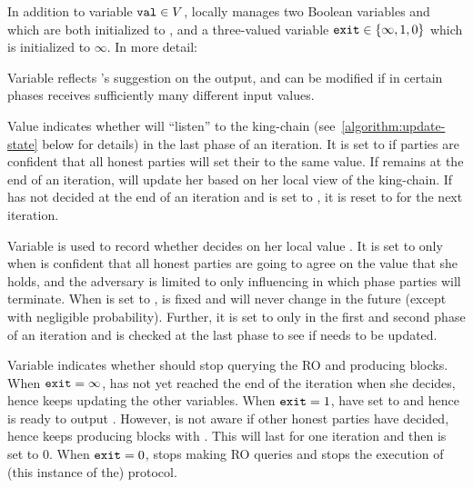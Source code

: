 In addition to variable $\mathtt{val} \in V$, \party locally manages two Boolean variables \lock and \decide which are both initialized to \false, and a three-valued variable $\mathtt{exit} \in \{\infty, 1, 0\}$ which is initialized to $\infty$.
%
In more detail:

\begin{cccItemize}[noitemsep]
    \item Variable \val reflects \party's suggestion on the output, and can be modified if in certain phases \party receives sufficiently many different input values.

    \item Value \lock indicates whether \party will ``listen'' to the king-chain (see~\cref{algorithm:update-state} below for details) in the last phase of an iteration.
    It is set to \true if parties are confident that all honest parties will set their \val to the same value.
    If \lock remains \false at the end of an iteration, \party will update her \val based on her local view of the king-chain.
    If \party has not decided at the end of an iteration and \lock is set to \true, it is reset to \false for the next iteration.

    \item Variable \decide is used to record whether \party decides on her local value \val.
    It is set to \true only when \party is confident that all honest parties are going to agree on the value that she holds, and the adversary is limited to only influencing in which phase parties will terminate.
    When \decide is set to \true, \val is fixed and will never change in the future (except with negligible probability).
    Further, it is set to \true only in the first and second phase of an iteration and is checked at the last phase to see if \exit needs to be updated.

    \item Variable \exit indicates whether \party should stop querying the RO and producing blocks.
    When $\mathtt{exit} = \infty$, \party has not yet reached the end of the iteration when she decides, hence \party keeps updating the other variables.
    When $\mathtt{exit} = 1$, \party have set \decide to \true and hence is ready to output \val.
    However, \party is not aware if other honest parties have decided, hence \party keeps producing blocks with \val.
    This will last for one iteration and then \exit is set to $0$.
    When $\mathtt{exit} = 0$, \party stops making RO queries and stops the execution of (this instance of the) protocol.
\end{cccItemize}

